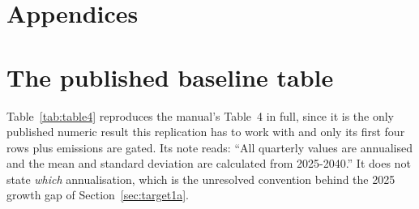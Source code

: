 \appendix
\section*{Appendices}

\section{The published baseline table}
\label{app:table4}

Table~\ref{tab:table4} reproduces the manual's Table~4 \citep[p.~50]{georgedafermos2026manual} in full, since it is the only published numeric result this replication has to work with and only its first four rows plus emissions are gated. Its note reads: ``All quarterly values are annualised and the mean and standard deviation are calculated from 2025-2040.'' It does not state \emph{which} annualisation, which is the unresolved convention behind the 2025 growth gap of Section~\ref{sec:target1a}.

